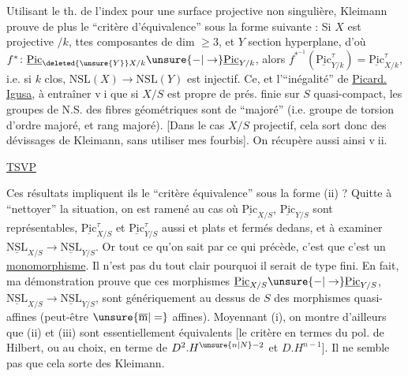 Utilisant le th. de l'index pour une surface projective non singulière, Kleimann prouve de plus le ``critère d'équivalence'' sous la forme suivante : Si $X$ est projective $/k$, ttes  composantes de dim $\geq3$, et $Y$ section hyperplane, d'où $f^*\colon\underline{\mathrm{Pic}}_{\deleted{\unsure{Y}}X/k}\unsure{-|\to}\underline{\mathrm{Pic}}_{Y/k}$, alors $f^{*^{-1}}(\underline{\mathrm{Pic}}^\tau_{Y/k})=\underline{\mathrm{Pic}}^\tau_{X/k}$, i.e. si $k$  clos, $\mathrm{NSL}(X)\to\mathrm{NSL}(Y)$ est injectif. Ce, et l'``inégalité'' de \uline{Picard. Igusa},   à entraîner \textcircled{\scriptsize vi} que si $X/S$ est propre de prés. finie sur  $S$ quasi-compact, les groupes de N.S. des fibres géométriques sont de   ``majoré''  (i.e. groupe de torsion d'ordre majoré, et rang majoré). [Dans le cas $X/S$ projectif, cela sort donc des dévissages de Kleimann, sans utiliser mes fourbis]. On récupère aussi ainsi \textcircled{\scriptsize vii}.

\uline{TSVP}

Ces résultats impliquent ils le ``critère  équivalence'' sous la forme (ii) ? Quitte à ``nettoyer'' la situation, on est ramené au cas où $\underline{\mathrm{Pic}}_{X/S}$, $\underline{\mathrm{Pic}}_{Y/S}$ sont représentables, $\underline{\mathrm{Pic}}^\tau_{X/S}$ et $\underline{\mathrm{Pic}}^\tau_{Y/S}$ aussi et plats et fermés dedans, et à examiner $\underline{\mathrm{NSL}}_{X/S}\to\underline{\mathrm{NSL}}_{Y/S}$. Or tout ce qu'on sait par ce qui précède, c'est que c'est un \uline{monomorphisme}. Il n'est pas du tout clair pourquoi il serait de type fini. En fait, ma démonstration prouve que ces morphismes $\underline{\mathrm{Pic}}_{X/S}\unsure{-|\to}\underline{\mathrm{Pic}}_{Y/S}$, $\underline{\mathrm{NSL}}_{X/S}\to\underline{\mathrm{NSL}}_{Y/S}$, sont génériquement au dessus de $S$ des morphismes quasi-affines (peut-être $\unsure{\overline{\mathrm{m}}|=}$ affines). Moyennant (i), on montre d'ailleurs que (ii) et (iii) sont essentiellement équivalents [le critère en termes du pol. de Hilbert, ou au choix, en terme de $D^2.H^{\unsure{n|N}-2}$ et $D.H^{n-1}$]. Il ne semble pas que cela sorte des  Kleimann.

